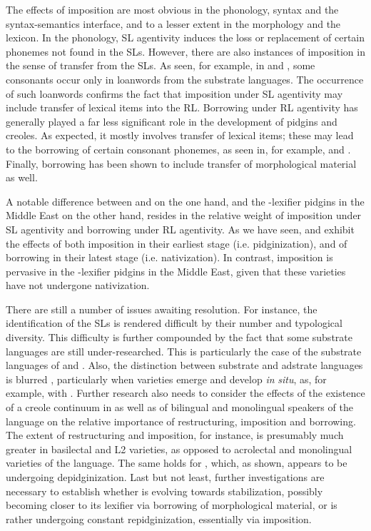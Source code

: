 \documentclass[output=paper]{langsci/langscibook}
\begin{document}
The effects of {imposition} are most obvious in the phonology, syntax and the syntax-semantics interface, and to a lesser extent in the morphology and the lexicon. In the phonology, {SL} agentivity induces the loss or replacement of certain phonemes not found in the SLs. However, there are also instances of {imposition} in the sense of {transfer} from the SLs. As seen, for example, in  and  , some consonants occur only in {loanwords} from the {substrate} languages. The occurrence of such {loanwords} confirms the fact that {imposition} under {SL} agentivity may include {transfer} of lexical items into the {RL}. Borrowing under {RL} agentivity has generally played a far less significant role in the development of  pidgins and creoles. As expected, it mostly involves {transfer} of lexical items; these may lead to the borrowing of certain consonant phonemes, as seen in, for example,   and . Finally, borrowing has been shown to include {transfer} of morphological material as well.

A notable difference between   and  on the one hand, and the -{lexifier} pidgins in the Middle East on the other hand, resides in the {relative} weight of {imposition} under {SL} agentivity and borrowing under {RL} agentivity. As we have seen,   and  exhibit the effects of both {imposition} in their earliest stage (i.e. pidginization), and of borrowing in their latest stage (i.e. nativization). In contrast, {imposition} is pervasive in the -{lexifier} pidgins in the Middle East, given that these varieties have not undergone nativization.

  There are still a number of issues awaiting resolution. For instance, the identification of the SLs is rendered difficult by their number and typological diversity. This difficulty is further compounded by the fact that some {substrate} languages are still under-researched. This is particularly the case of the {substrate} languages of   and . Also, the distinction between {substrate} and {adstrate} languages is blurred \citep[132]{Nakao2012}, particularly when varieties emerge and develop \textit{in} \textit{situ}, as, for example, with  . Further research also needs to consider the effects of the existence of a {creole} continuum in   as well as of bilingual and {monolingual} speakers of the language on the {relative} importance of restructuring, {imposition} and borrowing. The extent of restructuring and {imposition}, for instance, is presumably much greater in basilectal and L2 varieties, as opposed to acrolectal and {monolingual} varieties of the language. The same holds for  , which, as shown, appears to be undergoing depidginization. Last but not least, further investigations are necessary to establish whether  is evolving towards stabilization, possibly becoming closer to its {lexifier} via borrowing of morphological material, or is rather undergoing constant repidginization, essentially via {imposition}.  
\end{document}
